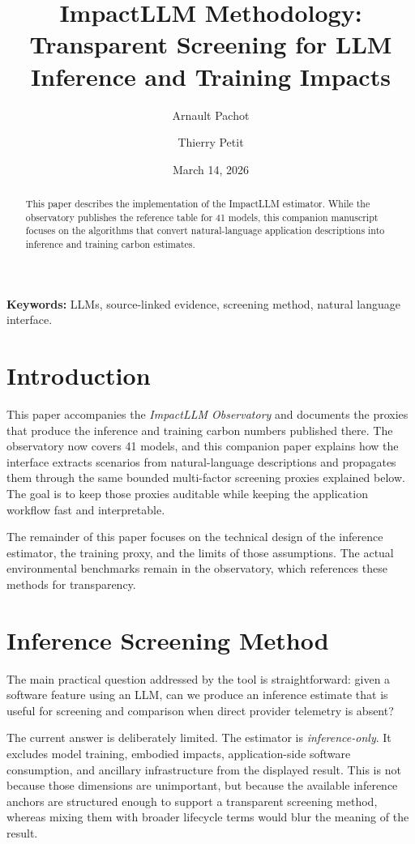 \documentclass[10pt,a4paper]{article}
\title{ImpactLLM Methodology: Transparent Screening for LLM Inference and Training Impacts}
\author{Arnault Pachot \and Thierry Petit}
\date{March 14, 2026}
\begin{document}
\maketitle

\begin{abstract}
This paper describes the implementation of the ImpactLLM estimator. While the observatory publishes the reference table for 41 models, this companion manuscript focuses on the algorithms that convert natural-language application descriptions into inference and training carbon estimates.
\end{abstract}

\textbf{Keywords:} LLMs, source-linked evidence, screening method, natural language interface.
\section{Introduction}
This paper accompanies the \emph{ImpactLLM Observatory} and documents the proxies that produce the inference and training carbon numbers published there. The observatory now covers 41 models, and this companion paper explains how the interface extracts scenarios from natural-language descriptions and propagates them through the same bounded multi-factor screening proxies explained below. The goal is to keep those proxies auditable while keeping the application workflow fast and interpretable.

The remainder of this paper focuses on the technical design of the inference estimator, the training proxy, and the limits of those assumptions. The actual environmental benchmarks remain in the observatory, which references these methods for transparency.


\section{Inference Screening Method}
The main practical question addressed by the tool is straightforward: given a software feature using an LLM, can we produce an inference estimate that is useful for screening and comparison when direct provider telemetry is absent?

The current answer is deliberately limited. The estimator is \emph{inference-only}. It excludes model training, embodied impacts, application-side software consumption, and ancillary infrastructure from the displayed result. This is not because those dimensions are unimportant, but because the available inference anchors are structured enough to support a transparent screening method, whereas mixing them with broader lifecycle terms would blur the meaning of the result.
\end{document}
